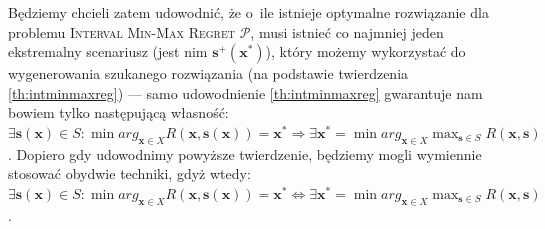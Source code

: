 Będziemy chcieli zatem udowodnić, że o~ile istnieje optymalne rozwiązanie dla problemu \textsc{Interval Min-Max Regret $\mathcal{P}$}, musi istnieć co najmniej jeden ekstremalny scenariusz (jest nim $\textbf{s}^{+} \left( \textbf{x}^{\ast} \right)$), który możemy wykorzystać do wygenerowania szukanego rozwiązania (na podstawie twierdzenia \ref{th:intminmaxreg}) --- samo udowodnienie \ref{th:intminmaxreg} gwarantuje nam bowiem tylko następującą własność: $\exists \textbf{s} \left( \textbf{x} \right) \in S : \min arg_{\textbf{x} \in X} R \left( \textbf{x}, \textbf{s} \left( \textbf{x} \right) \right) = \textbf{x}^{\ast} \Rightarrow \exists \textbf{x}^{\ast} = \min arg_{\textbf{x} \in X} \max_{\textbf{s} \in S} R \left( \textbf{x}, \textbf{s} \right)$.
Dopiero gdy udowodnimy powyższe twierdzenie, będziemy mogli wymiennie stosować obydwie techniki, gdyż wtedy: $\exists \textbf{s} \left( \textbf{x} \right) \in S : \min arg_{\textbf{x} \in X} R \left( \textbf{x}, \textbf{s} \left( \textbf{x} \right) \right) = \textbf{x}^{\ast} \Leftrightarrow \exists \textbf{x}^{\ast} = \min arg_{\textbf{x} \in X} \max_{\textbf{s} \in S} R \left( \textbf{x}, \textbf{s} \right)$.
\\
